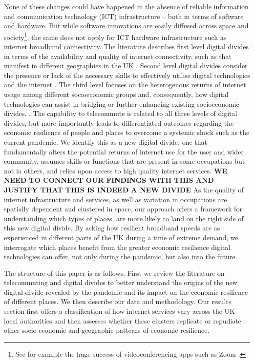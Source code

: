 \documentclass[]{interact}
\theoremstyle{plain}%
\theoremstyle{definition}
\theoremstyle{remark}
\begin{document}
None of these changes could have happened in the absence of reliable
information and communication technology (ICT) infrastructure -- both in
terms of software and hardware. But while software innovations are
easily diffused across space and society\footnote{See for example the
  huge success of videoconferencing apps such as Zoom
  \citep{marks2020zoom}.}, the same does not apply for ICT hardware
infrastructure such as internet broadband connectivity. The literature
describes first level digital divides in terms of the availability and
quality of internet connectivity, such as that manifest in different
geographies in the UK
\citep{riddlesden2014broadband, philip2017digital}. Second level digital
divides consider the presence or lack of the necessary skills to
effectively utilise digital technologies and the internet
\citep{blank2014dimensions, van2011internet}. The third level focuses on
the heterogenous returns of internet usage among different socioeconomic
groups and, consequently, how digital technologies can assist in
bridging or further enhancing existing socioeconomic divides.
\citep{stern2009levels, van2014digital, van2015third}. The capability to
telecommute is related to all three levels of digital divides, but more
importantly leads to differentiated outcomes regarding the economic
resilience of people and places to overcome a systemic shock such as the
current pandemic. We identify this as a new digital divide, one that
fundamentally alters the potential returns of internet use for the user
and wider community, assumes skills or functions that are present in
some occupations but not in others, and relies upon access to high
quality internet services. \textbf{WE NEED TO CONNECT OUR FINDINGS WITH
THIS AND JUSTIFY THAT THIS IS INDEED A NEW DIVIDE} As the quality of
internet infrastructure and services, as well as variation in
occupations are spatially dependent and clustered in space, our approach
offers a framework for understanding which types of places, are more
likely to land on the right side of this new digital divide. By asking
how resilient broadband speeds are as experienced in different parts of
the UK during a time of extreme demand, we interrogate which places
benefit from the greater economic resilience digital technologies can
offer, not only during the pandemic, but also into the future.

The structure of this paper is as follows. First we review the
literature on telecommuting and digital divides to better understand the
origins of the new digital divide revealed by the pandemic and its
impact on the economic resilience of different places. We then describe
our data and methodology. Our results section first offers a
classification of how internet services vary across the UK local
authorities and then assesses whether these clusters replicate or
repudiate other socio-economic and geographic patterns of economic
resilience.
\end{document}
